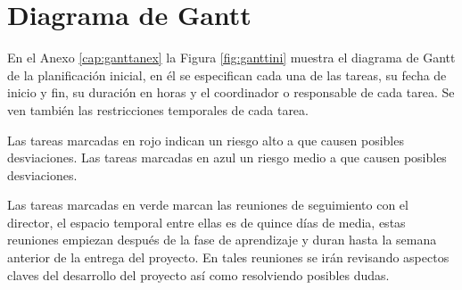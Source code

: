 \section{Diagrama de Gantt}
En el Anexo \ref{cap:ganttanex} la Figura \ref{fig:ganttini} muestra el diagrama de Gantt de la planificación inicial, en él se especifican cada una de las tareas, su fecha de inicio y fin, su duración en horas y el coordinador o responsable de cada tarea. Se ven también las restricciones temporales de cada tarea.

Las tareas marcadas en rojo indican un riesgo alto a que causen posibles desviaciones.
Las tareas marcadas en azul un riesgo medio a que causen posibles desviaciones.

Las tareas marcadas en verde marcan las reuniones de seguimiento con el director, el espacio temporal entre ellas es de quince días de media, estas reuniones empiezan después de la fase de aprendizaje y duran hasta la semana anterior de la entrega del proyecto. En tales reuniones se irán revisando aspectos claves del desarrollo del proyecto así como resolviendo posibles dudas.









